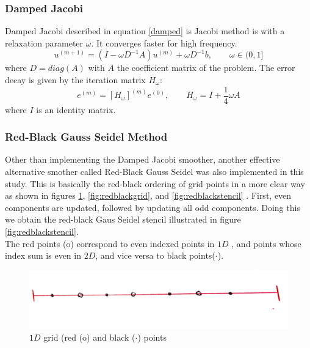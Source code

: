 \documentclass[12pt,a4paper]{article}
\begin{document}
	\subsubsection{Damped Jacobi}
	Damped  Jacobi described in equation \eqref{damped}  is Jacobi method is with a relaxation parameter $\omega$. It converges faster for high frequency.
	\begin{equation}
		u^{(m+1)} = (I - \omega D^{-1}A)u^{(m)} + \omega D^{-1} b, \qquad \omega \in (0,1]
		\label{damped}
	\end{equation}
	where $D = diag(A)$ with $A$ the coefficient matrix of the problem. The error decay is given by the iteration matrix $H_{\omega}$:
	\begin{equation}
		e^{(m)} = [H_{\omega}]^{(m)} e^{(0)}, \qquad  H_{\omega} = I +\frac{1}{4}\omega A
		\label{errordj}
	\end{equation}
	where $I$ is an identity matrix.
	\subsubsection{Red-Black Gauss Seidel Method}
	Other than implementing the Damped Jacobi smoother, another effective alternative smother called Red-Black Gauss Seidel was also implemented in this study. This is basically the red-black ordering of grid points in a more clear way as shown in figures \ref{fig:red-black1}, \ref{fig:redblackgrid}, and \ref{fig:redblackstencil} \cite{trottenberg2000multigrid}. First, even components are updated, followed by updating all odd components. Doing this we obtain the red-black Gaus Seidel stencil illustrated in figure \ref{fig:redblackstencil}.   \\
	
		\noindent The red points (o) correspond to even indexed points in $1D$ \cite{briggs2000multigrid}, and points whose index sum is even in $2D$, and vice versa to black points($\cdot$). 
	
	\begin{figure}[h]
		\centering
		\includegraphics[width=0.7\linewidth]{red-black1}
		\caption{$1D$ grid (red (o) and black ($\cdot$) points }
		\label{fig:red-black1}
	\end{figure}
	
\end{document}
